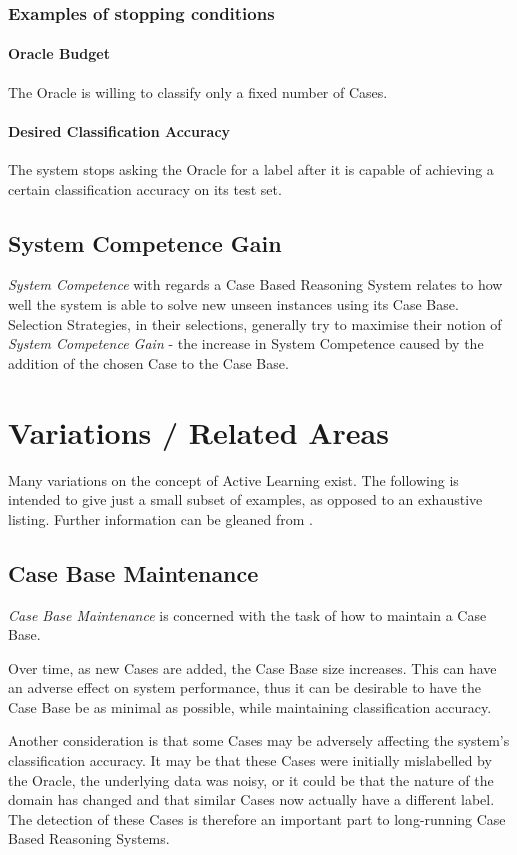 \documentclass[a4paper,11pt]{report}
\begin{document}
\subsubsection{Examples of stopping conditions}
\paragraph{Oracle Budget} 
The Oracle is willing to classify only a fixed number of Cases.

\paragraph{Desired Classification Accuracy} 
The system stops asking the Oracle for a label after it is capable of achieving a certain classification accuracy on its test set.

\subsection{System Competence Gain}
\emph{System Competence} with regards a Case Based Reasoning System relates to how well the system is able to solve new unseen instances using its Case Base. Selection Strategies, in their selections, generally try to maximise their notion of \emph{System Competence Gain} - the increase in System Competence caused by the addition of the chosen Case to the Case Base.

\section{Variations / Related Areas}
Many variations on the concept of Active Learning exist. The following is intended to give just a small subset of examples, as opposed to an exhaustive listing. Further information can be gleaned from \citet{Settles2010}.

\subsection{Case Base Maintenance}
\emph{Case Base Maintenance} is concerned with the task of how to maintain a Case Base. 

Over time, as new Cases are added, the Case Base size increases. This can have an adverse effect on system performance, thus it can be desirable to have the Case Base be as minimal as possible, while maintaining classification accuracy.

Another consideration is that some Cases may be adversely affecting the system's classification accuracy. It may be that these Cases were initially mislabelled by the Oracle, the underlying data was noisy, or it could be that the nature of the domain has changed and that similar Cases now actually have a different label. The detection of these Cases is therefore an important part to long-running Case Based Reasoning Systems.
\end{document}
